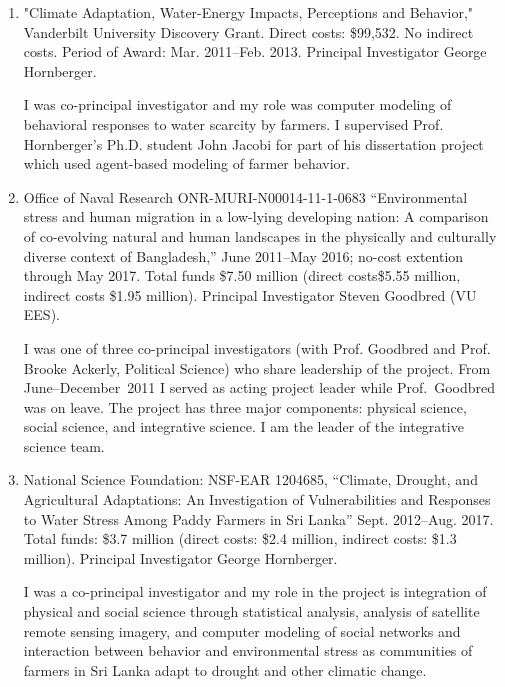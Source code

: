 \begin{enumerate}
\begin{credit}
\end{credit}
%
%
\item "Climate Adaptation, Water-Energy Impacts, Perceptions and Behavior," Vanderbilt University Discovery Grant. Direct costs: \$99,532. No indirect costs. Period of Award: Mar. 2011--Feb. 2013. Principal Investigator George Hornberger.
\begin{credit}
I was co-principal investigator and my role was computer modeling of behavioral responses to water scarcity by farmers. I supervised Prof. Hornberger's Ph.D. student John Jacobi for part of his dissertation project which used agent-based modeling of farmer behavior.
\end{credit}
%
%
\item Office of Naval Research ONR-MURI-N00014-11-1-0683 ``Environmental stress and human migration in a low-lying developing nation: A comparison of co-evolving natural and human landscapes in the physically and culturally diverse context of Bangladesh,'' June 2011--May 2016; no-cost extention through May 2017. Total funds \$7.50 million (direct costs\$5.55 million, indirect costs \$1.95 million). Principal Investigator Steven Goodbred (VU EES).
\begin{credit}
I was one of three co-principal investigators (with Prof. Goodbred and Prof. Brooke Ackerly, Political Science) who share leadership of the project. From June--December~2011 I served as acting project leader while Prof.~Goodbred was on leave. The project has three major components: physical science, social science, and integrative science. I am the leader of the integrative science team.
\end{credit}
%
%
\item National Science Foundation: NSF-EAR 1204685, ``Climate, Drought, and Agricultural Adaptations: An Investigation of Vulnerabilities and Responses to Water Stress Among Paddy Farmers in Sri Lanka'' Sept. 2012--Aug. 2017. Total funds: \$3.7 million (direct costs: \$2.4 million, indirect costs: \$1.3 million). Principal Investigator George Hornberger.
\begin{credit}
I was a co-principal investigator and my role in the project is integration of physical and social science through statistical analysis, analysis of satellite remote sensing imagery, and computer modeling of social networks and interaction between behavior and environmental stress as communities of farmers in Sri Lanka adapt to drought and other climatic change.
\end{credit}
\end{enumerate}
\iffalse
\subsubsection{Under Review}
\begin{enumerate}
  \iffalse
  \fi

\end{enumerate}%
\fi
